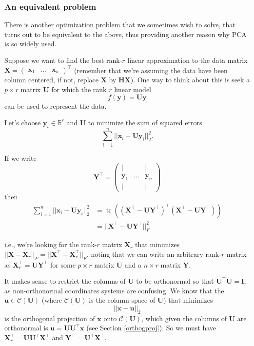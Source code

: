 \documentclass[]{book}
\theoremstyle{definition}
\theoremstyle{definition}
\theoremstyle{definition}
\theoremstyle{remark}
\begin{document}
\hypertarget{an-equivalent-problem}{%
\subsubsection*{An equivalent problem}\label{an-equivalent-problem}}

There is another optimization problem that we sometimes wish to solve, that turns out to be equivalent to the above, thus providing another reason why PCA is so widely used.

Suppose we want to find the best rank-\(r\) linear approximation to the data matrix \(\mathbf X=\begin{pmatrix}\mathbf x_1& \ldots & \mathbf x_n\end{pmatrix}^\top\) (remember that we're assuming the data have been column centered, if not, replace \(\mathbf X\) by \(\mathbf H\mathbf X\)). One way to think about this is seek a \(p\times r\) matrix \(\mathbf U\) for which the rank \(r\) linear model
\[f(\mathbf y) = \mathbf U\mathbf y\] can be used to represent the data.

Let's choose \(\mathbf y_i\in \mathbb{R}^r\) and \(\mathbf U\) to minimize the sum of squared errors
\[\sum_{i=1}^n ||\mathbf x_i - \mathbf U\mathbf y_i||^2_2.\]

If we write
\[\mathbf Y^\top = \begin{pmatrix} 
| &&|\\
\mathbf y_1& \ldots & \mathbf y_n\\
| &&|
\end{pmatrix}\]
then
\begin{align*}
\sum_{i=1}^n ||\mathbf x_i - \mathbf U\mathbf y_i||^2_2 &=\operatorname{tr}((\mathbf X^\top - \mathbf U\mathbf Y^\top)^\top (\mathbf X^\top - \mathbf U\mathbf Y^\top))\\
&=||\mathbf X^\top - \mathbf U\mathbf Y^\top||_F^2
\end{align*}

i.e., we're looking for the rank-\(r\) matrix \(\mathbf X_r\) that minimizes \(||\mathbf X- \mathbf X_r||_F=||\mathbf X^\top - \mathbf X_r^\top||_F\), noting that we can write an arbitrary rank-\(r\) matrix as \(\mathbf X_r^\top = \mathbf U\mathbf Y^\top\) for some \(p\times r\) matrix \(\mathbf U\) and a \(n \times r\) matrix \(\mathbf Y\).

It makes sense to restrict the columns of \(\mathbf U\) to be orthonormal so that \(\mathbf U^\top \mathbf U=\mathbf I_r\) as non-orthonormal coordinates systems are confusing. We know that the \(\mathbf u\in \mathcal{C}(\mathbf U)\) (where \(\mathcal{C}(\mathbf U)\) is the column space of \(\mathbf U\)) that minimizes
\[||\mathbf x-\mathbf u||_2\]
is the orthogonal projection of \(\mathbf x\) onto \(\mathcal{C}(\mathbf U)\), which given the columns of \(\mathbf U\) are orthonormal is \(\mathbf u= \mathbf U\mathbf U^\top \mathbf x\) (see Section \ref{orthogproj}). So we must have \(\mathbf X_r^\top = \mathbf U\mathbf U^\top \mathbf X^\top\) and \(\mathbf Y^\top = \mathbf U^\top \mathbf X^\top\).
\end{document}
